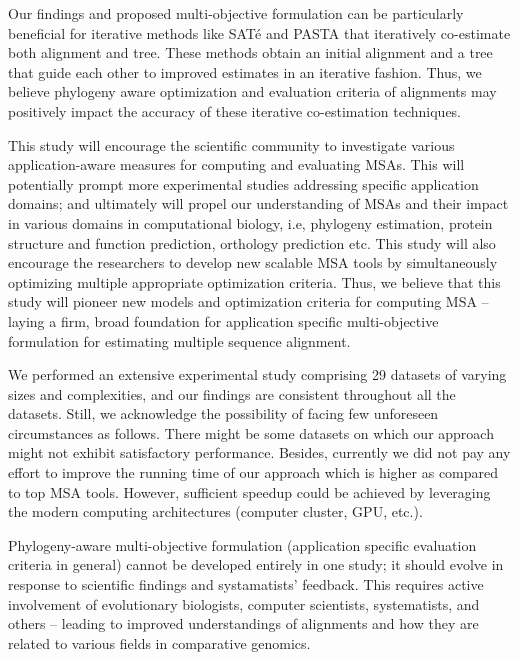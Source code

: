 Our findings and proposed multi-objective formulation can be particularly beneficial for iterative methods like SAT\'e and PASTA that iteratively co-estimate both  alignment and tree. These methods obtain an initial alignment and a tree that guide each other to improved estimates in an iterative fashion. Thus, we believe phylogeny aware optimization and evaluation criteria of alignments may positively impact the accuracy of these iterative co-estimation techniques.

This study will encourage the scientific community to investigate various application-aware measures for computing and evaluating MSAs. This will potentially prompt more experimental studies addressing specific application domains; and ultimately will propel our understanding of MSAs and their impact in various domains in computational biology, i.e, phylogeny estimation, protein structure and function prediction, orthology prediction etc. This study will also encourage the researchers to develop new scalable MSA tools by simultaneously optimizing multiple appropriate optimization criteria. Thus, we believe that this study will pioneer new models and optimization criteria for computing MSA -- laying a firm, broad foundation for application specific multi-objective formulation for estimating multiple sequence alignment.

We performed an extensive experimental study comprising 29 datasets of varying sizes and complexities, and our findings are consistent throughout all the datasets. Still, we acknowledge the possibility of facing few unforeseen circumstances as follows. There might be some datasets on which our approach might not exhibit satisfactory performance. Besides, currently we did not pay any effort to improve the running time of our approach which is higher as compared to top MSA tools. However, sufficient speedup could be achieved by leveraging the modern computing architectures (computer cluster, GPU, etc.). 

Phylogeny-aware multi-objective formulation (application specific evaluation criteria in general) cannot be developed entirely in one study; it should evolve in response to scientific findings and systamatists' feedback. This requires active involvement of evolutionary biologists, computer scientists, systematists, and others -- leading to improved understandings of alignments and how they are related to various fields in comparative genomics.






